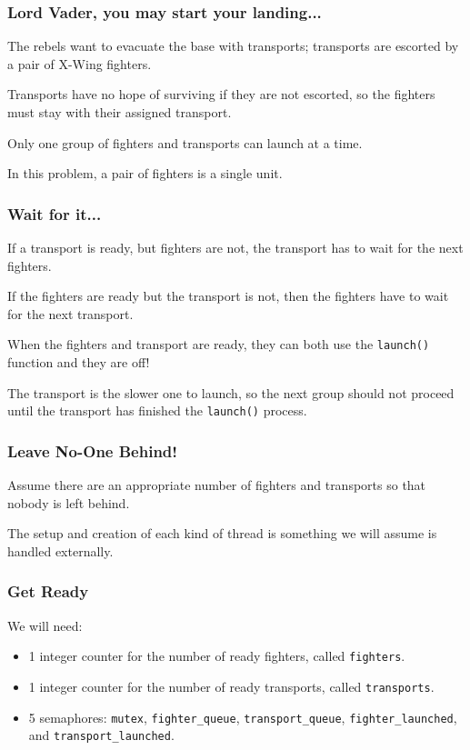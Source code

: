 \begin{frame}
\frametitle{Lord Vader, you may start your landing...}

The rebels want to evacuate the base with transports; transports are escorted by a pair of X-Wing fighters. 

Transports have no hope of surviving if they are not escorted, so the fighters must stay with their assigned transport. 

Only one group of fighters and transports can launch at a time. 

In this problem,  a pair of fighters is a single unit.

\end{frame}


\begin{frame}
\frametitle{Wait for it...}

If a transport is ready, but fighters are not, the transport has to wait for the next fighters. 

If the fighters are ready but the transport is not, then the fighters have to wait for the next transport. 

When the fighters and transport are ready, they can both use the \texttt{launch()} function and they are off! 

The transport is the slower one to launch, so the next group should not proceed until the transport has finished the \texttt{launch()} process.


\end{frame}


\begin{frame}
\frametitle{Leave No-One Behind!}


Assume there are an appropriate number of fighters and transports so that nobody is left behind. 

The setup and creation of each kind of thread is something we will assume is handled externally.

\end{frame}


\begin{frame}
\frametitle{Get Ready}

We will need:

\begin{itemize}
\item 1 integer counter for the number of ready fighters, called \texttt{fighters}.
\item 1 integer counter for the number of ready transports, called \texttt{transports}.
\item 5 semaphores: \texttt{mutex}, \texttt{fighter\_queue}, \texttt{transport\_queue}, \texttt{fighter\_launched}, and \texttt{transport\_launched}.
\end{itemize}


\end{frame}


